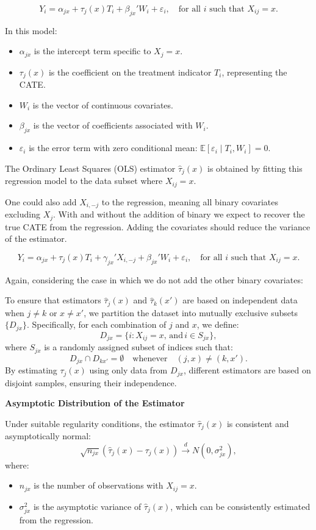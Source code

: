 \documentclass{article}
\begin{document}
\[
Y_i = \alpha_{jx} + \tau_j(x) T_i + \beta_{jx}' W_i + \varepsilon_i, \quad \text{for all } i \text{ such that } X_{ij} = x.
\]

In this model:
\begin{itemize}
    \item \( \alpha_{jx} \) is the intercept term specific to \( X_j = x \).
    \item \( \tau_j(x) \) is the coefficient on the treatment indicator \( T_i \), representing the CATE.
    \item \( W_i \) is the vector of continuous covariates.
    \item \( \beta_{jx} \) is the vector of coefficients associated with \( W_i \).
    \item \( \varepsilon_i \) is the error term with zero conditional mean: \( \mathbb{E}[ \varepsilon_i \mid T_i, W_i ] = 0 \).
\end{itemize}
The Ordinary Least Squares (OLS) estimator \( \hat{\tau}_j(x) \) is obtained by fitting this regression model to the data subset where \( X_{ij} = x \).

One could also add $X_{i, -j}$ to the regression, meaning all binary covariates excluding $X_j$. With and without the addition of binary we expect to recover the true CATE from the regression. Adding the covariates should reduce the variance of the estimator.

$$
Y_i = \alpha_{jx} + \tau_j(x) T_i + \gamma_{jx}' X_{i,-j} + \beta_{jx}' W_i + \varepsilon_i, \quad \text{for all } i \text{ such that } X_{ij} = x.
$$

Again, considering the case in which we do not add the other binary covariates:

To ensure that estimators \( \hat{\tau}_j(x) \) and \( \hat{\tau}_k(x') \) are based on independent data when \( j \neq k \) or \( x \neq x' \), we partition the dataset into mutually exclusive subsets \( \{ D_{jx} \} \). Specifically, for each combination of \( j \) and \( x \), we define:
\[
D_{jx} = \{ i : X_{ij} = x, \, \text{and} \, i \in S_{jx} \},
\]
where \( S_{jx} \) is a randomly assigned subset of indices such that:
\[
D_{jx} \cap D_{k x'} = \emptyset \quad \text{whenever} \quad (j, x) \neq (k, x').
\]
By estimating \( \tau_j(x) \) using only data from \( D_{jx} \), different estimators are based on disjoint samples, ensuring their independence.

\textbf{Asymptotic Distribution of the Estimator}

Under suitable regularity conditions, the estimator \( \hat{\tau}_j(x) \) is consistent and asymptotically normal:
\[
\sqrt{n_{jx}} \left( \hat{\tau}_j(x) - \tau_j(x) \right) \xrightarrow{d} N\left( 0, \sigma^2_{jx} \right),
\]
where:
\begin{itemize}
    \item \( n_{jx} \) is the number of observations with \( X_{ij} = x \).
    \item \( \sigma^2_{jx} \) is the asymptotic variance of \( \hat{\tau}_j(x) \), which can be consistently estimated from the regression.
\end{itemize}
\end{document}
